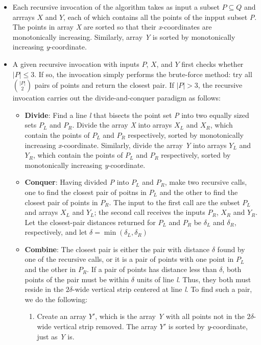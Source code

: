 \documentclass{report}
\begin{document}
\begin{itemize}
    \item Each recursive invocation of the algorithm takes as input a subset $P \subseteq Q$ and arrrays $X$ and $Y$, each of which contains all the points of the inpput subset \textit{P}. The points in array \textit{X} are sorted so that their \textit{x}-coordinates are monotonically increasing. Similarly, array \textit{Y} is sorted by monotonically increasing \textit{y}-coordinate.
    \item A given recursive invocation with inputs $P$, $X$, and $Y$ first checks whether $|P| \leq 3$. If so, the invocation simply performs the brute-force method: try all $|P| \choose 2$ pairs of points and return the closest pair. If $|P| > 3$, the recursive invocation carries out the divide-and-conquer paradigm as follows:
    \begin{itemize}
        \item \textbf{Divide}: Find a line \textit{l} that bisects the point set \textit{P} into two equally sized sets $P_L$ and $P_R$. Divide the array \textit{X} into arrays $X_L$ and $X_R$, which contain the points of $P_L$ and $P_R$ respectively, sorted by monotonically increasing \textit{x}-coordinate. Similarly, divide the array \textit{Y} into arrays $Y_L$ and $Y_R$, which contain the points of $P_L$ and $P_R$ respectively, sorted by monotonically increasing \textit{y}-coordinate.
        \item \textbf{Conquer}: Having divided \textit{P} into $P_L$ and $P_R$, make two recursive calls, one to find the closest pair of poitns in $P_L$ and the other to find the closest pair of points in $P_R$. The input to the first call are the subset $P_L$ and arrays $X_L$ and $Y_L$; the second call receives the inputs $P_R$, $X_R$ and $Y_R$. Let the closest-pair distances returned for $P_L$ and $P_R$ be $\delta_L$ and $\delta_R$, respectively, and let $\delta = \min(\delta_L, \delta_R)$
        \item \textbf{Combine}: The closest pair is either the pair with distance $\delta$ found by one of the recursive calls, or it is a pair of points with one point in $P_L$ and the other in $P_R$. If a pair of points has distance less than $\delta$, both points of the pair must be within $\delta$ units of line \textit{l}. Thus, they both must reside in the $2\delta$-wide vertical strip centered at line \textit{l}. To find such a pair, we do the following:
        \begin{enumerate}
            \item Create an array $Y'$, which is the array \textit{Y} with all points not in the $2\delta$-wide vertical strip removed. The array $Y'$ is sorted by \textit{y}-coordinate, just as \textit{Y} is.

\end{enumerate}
\end{itemize}
\end{itemize}
\end{document}
